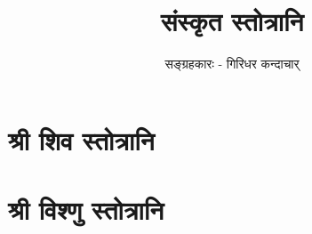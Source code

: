 \documentclass[twoside,a5paper]{report}
\title{\Huge \sanskrit संस्कृत स्तोत्रानि}
\author{\small \sanskrit सङ्ग्रहकारः - गिरिधर कन्दाचार्}
\newcommand*\NewPage{\newpage\null\thispagestyle{empty}\newpage}
\begin{document}
\maketitle
\NewPage
{}
\tableofcontents
{}

\chapter{\color{orange}\sanskrit श्री शिव स्तोत्रानि}


\chapter{\color{orange}\sanskrit श्री विश्णु स्तोत्रानि}

\end{document}
